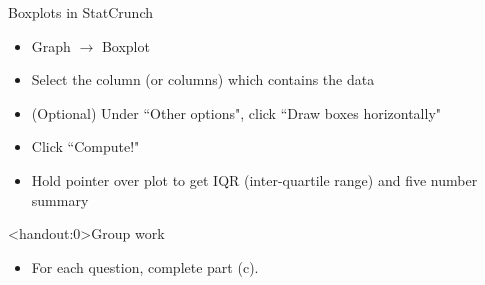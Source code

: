 \documentclass[xcolor=table]{beamer}
\begin{document}
\begin{frame}{Boxplots in StatCrunch}
\begin{block}{}
\begin{itemize}
\item Graph $\to$ Boxplot
\item Select the column (or columns) which contains the data
\item (Optional) Under ``Other options", click ``Draw boxes horizontally"
\item Click ``Compute!"
\item Hold pointer over plot to get IQR (inter-quartile range) and five number summary
\end{itemize}
\end{block}

\end{frame}

\begin{frame}<handout:0>{Group work}
\begin{block}{}
\large
\begin{itemize}
\item For each question, complete part (c).
\end{itemize}
\end{block}
\end{frame}
\end{document}
